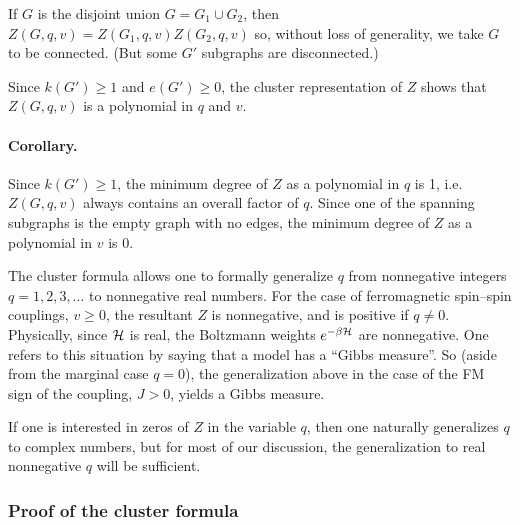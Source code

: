 If $G$ is the disjoint union $G = G_1\cup G_2$, then $Z(G,q,v) = Z(G_1,q,v)Z(G_2,q,v)$ so, without loss of generality, we
take $G$ to be connected. (But some $G'$ subgraphs are disconnected.)

Since $k(G')\ge 1$ and $e(G')\ge 0$, the cluster representation of $Z$ shows that $Z(G,q,v)$ is a polynomial in $q$ and $v$.

\paragraph{Corollary.} Since $k(G')\ge 1$, the minimum degree of $Z$ as a polynomial in $q$ is 1, i.e.\ $Z(G,q,v)$ always
contains an overall factor of $q$. Since one of the spanning subgraphs is the empty graph with no edges, the minimum degree of
$Z$ as a polynomial in $v$ is 0.

The cluster formula allows one to formally generalize $q$ from nonnegative integers $q = 1,2,3,\ldots$ to nonnegative real
numbers. For the case of ferromagnetic spin--spin couplings, $v\ge 0$, the resultant $Z$ is nonnegative, and is positive if
$q\ne 0$. Physically, since $\mathcal{H}$ is real, the Boltzmann weights $e^{-\beta\mathcal{H}}$ are nonnegative. One refers to this situation
by saying that a model has a ``Gibbs measure''. So (aside from the marginal case $q = 0$), the generalization above in the case
of the FM sign of the coupling, $J>0$, yields a Gibbs measure.

If one is interested in zeros of $Z$ in the variable $q$, then one naturally generalizes $q$ to complex numbers, but for most of
our discussion, the generalization to real nonnegative $q$ will be sufficient.

\subsubsection*{Proof of the cluster formula}

